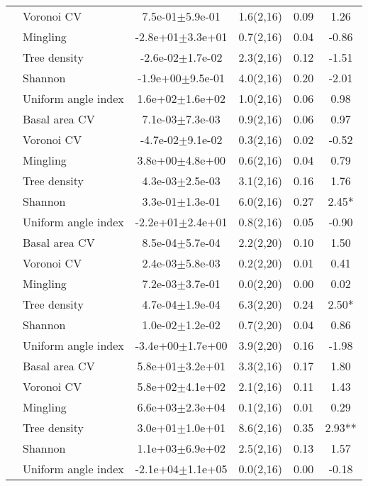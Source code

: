 \begin{longtable}{llcccS[table-format=-2.2, table-space-text-post = {***}]}
   & Voronoi CV &  7.5e-01$\pm$5.9e-01 & 1.6(2,16) & 0.09 & 1.26 \\ 
   & Mingling & -2.8e+01$\pm$3.3e+01 & 0.7(2,16) & 0.04 & -0.86 \\ 
   & Tree density & -2.6e-02$\pm$1.7e-02 & 2.3(2,16) & 0.12 & -1.51 \\ 
   & Shannon & -1.9e+00$\pm$9.5e-01 & 4.0(2,16) & 0.20 & -2.01 \\ 
   & Uniform angle index &  1.6e+02$\pm$1.6e+02 & 1.0(2,16) & 0.06 & 0.98 \\ 
   \midrule
{} & Basal area CV &  7.1e-03$\pm$7.3e-03 & 0.9(2,16) & 0.06 & 0.97 \\ 
   & Voronoi CV & -4.7e-02$\pm$9.1e-02 & 0.3(2,16) & 0.02 & -0.52 \\ 
   & Mingling &  3.8e+00$\pm$4.8e+00 & 0.6(2,16) & 0.04 & 0.79 \\ 
   & Tree density &  4.3e-03$\pm$2.5e-03 & 3.1(2,16) & 0.16 & 1.76 \\ 
   & Shannon &  3.3e-01$\pm$1.3e-01 & 6.0(2,16) & 0.27 & 2.45* \\ 
   & Uniform angle index & -2.2e+01$\pm$2.4e+01 & 0.8(2,16) & 0.05 & -0.90 \\ 
   \midrule
{} & Basal area CV &  8.5e-04$\pm$5.7e-04 & 2.2(2,20) & 0.10 & 1.50 \\ 
   & Voronoi CV &  2.4e-03$\pm$5.8e-03 & 0.2(2,20) & 0.01 & 0.41 \\ 
   & Mingling &  7.2e-03$\pm$3.7e-01 & 0.0(2,20) & 0.00 & 0.02 \\ 
   & Tree density &  4.7e-04$\pm$1.9e-04 & 6.3(2,20) & 0.24 & 2.50* \\ 
   & Shannon &  1.0e-02$\pm$1.2e-02 & 0.7(2,20) & 0.04 & 0.86 \\ 
   & Uniform angle index & -3.4e+00$\pm$1.7e+00 & 3.9(2,20) & 0.16 & -1.98 \\ 
   \midrule
{} & Basal area CV &  5.8e+01$\pm$3.2e+01 & 3.3(2,16) & 0.17 & 1.80 \\ 
   & Voronoi CV &  5.8e+02$\pm$4.1e+02 & 2.1(2,16) & 0.11 & 1.43 \\ 
   & Mingling &  6.6e+03$\pm$2.3e+04 & 0.1(2,16) & 0.01 & 0.29 \\ 
   & Tree density &  3.0e+01$\pm$1.0e+01 & 8.6(2,16) & 0.35 & 2.93** \\ 
   & Shannon &  1.1e+03$\pm$6.9e+02 & 2.5(2,16) & 0.13 & 1.57 \\ 
   & Uniform angle index & -2.1e+04$\pm$1.1e+05 & 0.0(2,16) & 0.00 & -0.18 \\ 

\end{longtable}
